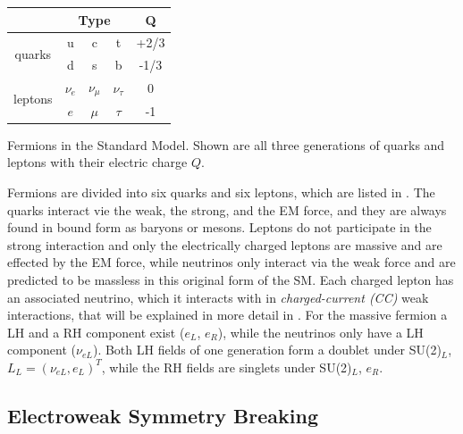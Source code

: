 \begin{margintable}
    \footnotesize
    \begin{tabular}{ ccccc }
    \hline\hline    
     & \multicolumn{3}{c}{\textbf{Type}} & \textbf{Q} \\     
    \hline\hline    
    \multirow{2}{*}[-0.3em]{ quarks } & u & c & t & +2/3 \\
    & d & s & b & -1/3 \\
    \hline
    \multirow{2}{*}[-0.3em]{ leptons } & $\nu_e$ & $\nu_{\mu}$ & $\nu_{\tau}$ & 0 \\
     & $e$ & ${\mu}$ & ${\tau}$ & -1 \\
    \hline
    \end{tabular}
\caption[Standard model fermions]{Fermions in the Standard Model. Shown are all three generations of quarks and leptons with their electric charge $Q$.}
\end{margintable}

Fermions are divided into six quarks and six leptons, which are listed in . The quarks interact vie the weak, the strong, and the EM force, and they are always found in bound form as baryons or mesons. Leptons do not participate in the strong interaction and only the electrically charged leptons are massive and are effected by the EM force, while neutrinos only interact via the weak force and are predicted to be massless in this original form of the SM. Each charged lepton has an associated neutrino, which it interacts with in \textit{charged-current (CC)} weak interactions, that will be explained in more detail in . For the massive fermion a LH and a RH component exist ($e_L$, $e_R$), while the neutrinos only have a LH component ($\nu_{eL}$). Both LH fields of one generation form a doublet under SU(2)$_L$, $L_L = (\nu_{eL}, e_L)^T$, while the RH fields are singlets under SU(2)$_L$, $e_R$.


\subsection{Electroweak Symmetry Breaking}

